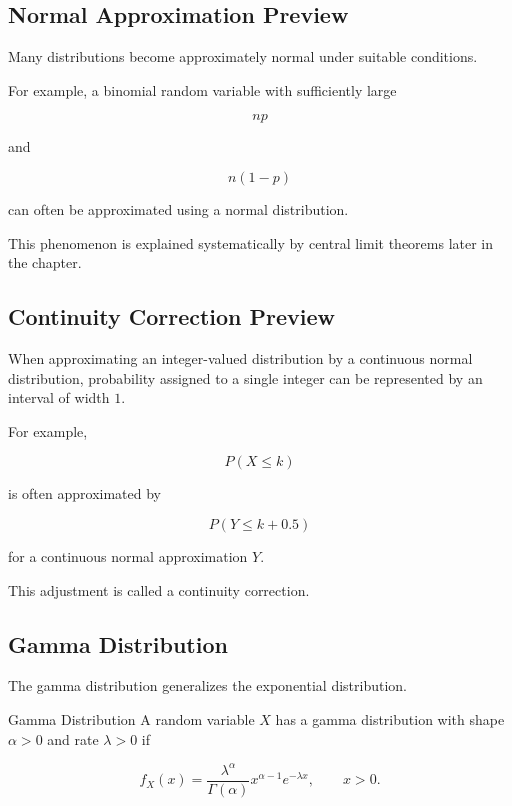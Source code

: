 \subsection{Normal Approximation Preview}
\label{subsec:normal-approximation-preview}

Many distributions become approximately normal under suitable
conditions.

For example, a binomial random variable with sufficiently large

\[
np
\]

and

\[
n(1-p)
\]

can often be approximated using a normal distribution.

This phenomenon is explained systematically by central limit theorems
later in the chapter.

\subsection{Continuity Correction Preview}
\label{subsec:continuity-correction-preview}

When approximating an integer-valued distribution by a continuous
normal distribution, probability assigned to a single integer can be
represented by an interval of width \(1\).

For example,

\[
P(X\leq k)
\]

is often approximated by

\[
\boxed{
P(Y\leq k+0.5)
}
\]

for a continuous normal approximation \(Y\).

This adjustment is called a continuity correction.

\subsection{Gamma Distribution}
\label{subsec:gamma-distribution}

The gamma distribution generalizes the exponential distribution.

\begin{definitionbox}{Gamma Distribution}
A random variable \(X\) has a gamma distribution with shape
\(\alpha>0\) and rate \(\lambda>0\) if

\[
\boxed{
f_X(x)
=
\frac{
\lambda^\alpha
}{
\Gamma(\alpha)
}
x^{\alpha-1}
e^{-\lambda x},
\qquad
x>0.
}
\]
\end{definitionbox}

